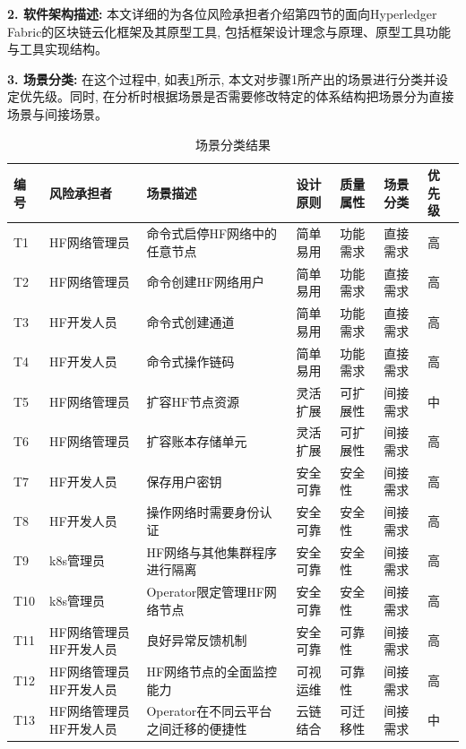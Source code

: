 \textbf{2. 软件架构描述: }本文详细的为各位风险承担者介绍第四节的面向Hyperledger Fabric的区块链云化框架及其原型工具, 包括框架设计理念与原理、原型工具功能与工具实现结构。

\textbf{3. 场景分类: }在这个过程中, 如表\ref{saam_step3}所示, 本文对步骤1所产出的场景进行分类并设定优先级。同时, 在分析时根据场景是否需要修改特定的体系结构把场景分为直接场景与间接场景。

{\footnotesize
\begin{longtable}[h]{m{20pt} m{60pt} m{90pt} m{40pt} m{40pt} m{40pt} m{30pt}}
    \caption[场景分类结果]{场景分类结果} \label{saam_step3}\\
        \hline  
        编号&风险承担者&场景描述&设计原则 & 质量属性 & 场景分类 & 优先级\\
        \hline
        T1&  HF网络管理员 & 命令式启停HF网络中的任意节点 & 简单易用  & 功能需求 & 直接需求 &  高 \\
        \hline
        T2&  HF网络管理员 & 命令创建HF网络用户 & 简单易用 & 功能需求 & 直接需求 &  高 \\
        \hline
        T3&  HF开发人员 & 命令式创建通道 & 简单易用 & 功能需求 & 直接需求 &  高 \\
        \hline
        T4&  HF开发人员 & 命令式操作链码 & 简单易用 & 功能需求 & 直接需求 &  高 \\
        \hline
        T5&  HF网络管理员 & 扩容HF节点资源 & 灵活扩展 & 可扩展性 & 间接需求 &  中 \\
        \hline
        T6&  HF网络管理员 & 扩容账本存储单元 & 灵活扩展 & 可扩展性 & 间接需求 &  高 \\
        \hline
        T7&  HF开发人员 & 保存用户密钥 & 安全可靠 & 安全性 & 间接需求 &  高 \\
        \hline
        T8&  HF开发人员 & 操作网络时需要身份认证 & 安全可靠 & 安全性 & 间接需求 &  高 \\
        \hline    
        T9&  k8s管理员 & HF网络与其他集群程序进行隔离 & 安全可靠 & 安全性 & 间接需求 &  高 \\
        \hline
        T10&  k8s管理员 & Operator限定管理HF网络节点 & 安全可靠 & 安全性 & 间接需求 &  高 \\
        \hline
        T11&  HF网络管理员 \newline HF开发人员 & 良好异常反馈机制 & 安全可靠 & 可靠性 & 间接需求 &  高 \\
        \hline
        T12&  HF网络管理员 \newline HF开发人员 & HF网络节点的全面监控能力 & 可视运维 & 可靠性 & 间接需求 &  高 \\
        \hline
        T13&  HF网络管理员 \newline HF开发人员 & Operator在不同云平台之间迁移的便捷性 & 云链结合 & 可迁移性 & 间接需求 &  中 \\
        \hline
    \end{longtable} 
}

